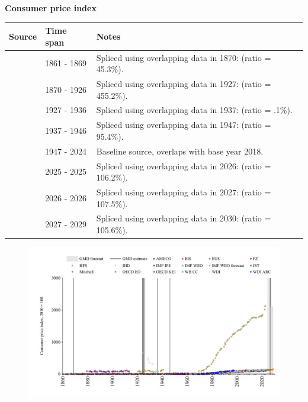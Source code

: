 \documentclass[12pt,a4paper,landscape]{article}
\begin{document}
\begin{adjustbox}{max totalsize={\paperwidth}{\paperheight},center}
\begin{minipage}[t][\textheight][t]{\textwidth}
\vspace*{0.5cm}
{}
\begin{center}
{\Large\bfseries Consumer price index}
\end{center}
\vspace{0.5cm}
\begin{table}[H]
\centering
\small
\begin{tabular}{|l|l|l|}
\hline
\textbf{Source} & \textbf{Time span} & \textbf{Notes} \\
\hline
\rowcolor{white}\cite{Mitchell}& 1861 - 1869 &Spliced using overlapping data in 1870: (ratio = 45.3\%). \\
\rowcolor{lightgray}\cite{JST}& 1870 - 1926 &Spliced using overlapping data in 1927: (ratio = 455.2\%). \\
\rowcolor{white}\cite{IHD}& 1927 - 1936 &Spliced using overlapping data in 1937: (ratio = .1\%). \\
\rowcolor{lightgray}\cite{JST}& 1937 - 1946 &Spliced using overlapping data in 1947: (ratio = 95.4\%). \\
\rowcolor{white}\cite{BIS}& 1947 - 2024 &Baseline source, overlaps with base year 2018. \\
\rowcolor{lightgray}\cite{OECD_EO}& 2025 - 2025 &Spliced using overlapping data in 2026: (ratio = 106.2\%). \\
\rowcolor{white}\cite{AMECO}& 2026 - 2026 &Spliced using overlapping data in 2027: (ratio = 107.5\%). \\
\rowcolor{lightgray}\cite{IMF_WEO_forecast}& 2027 - 2029 &Spliced using overlapping data in 2030: (ratio = 105.6\%). \\
\hline
\end{tabular}
\end{table}
\begin{figure}[H]
\centering
\includegraphics[width=\textwidth,height=0.6\textheight,keepaspectratio]{graphs/ITA_CPI.pdf}
\end{figure}
\end{minipage}
\end{adjustbox}
\end{document}
